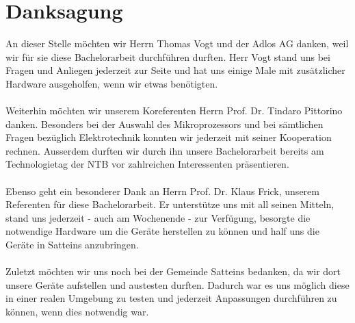 \section{Danksagung}
An dieser Stelle möchten wir Herrn Thomas Vogt und der Adlos AG danken, weil wir für sie diese Bachelorarbeit durchführen durften. Herr Vogt stand uns bei Fragen und Anliegen jederzeit zur Seite und hat uns einige Male mit zusätzlicher Hardware ausgeholfen, wenn wir etwas benötigten.\\\\
Weiterhin möchten wir unserem Koreferenten Herrn Prof. Dr. Tindaro Pittorino danken. Besonders bei der Auswahl des Mikroprozessors und bei sämtlichen Fragen bezüglich Elektrotechnik konnten wir jederzeit mit seiner Kooperation rechnen. Ausserdem durften wir durch ihn unsere Bachelorarbeit bereits am Technologietag der NTB vor zahlreichen Interessenten präsentieren.\\\\
Ebenso geht ein besonderer Dank an Herrn Prof. Dr. Klaus Frick, unserem Referenten für diese Bachelorarbeit. Er unterstütze uns mit all seinen Mitteln, stand uns jederzeit - auch am Wochenende - zur Verfügung, besorgte die notwendige Hardware um die Geräte herstellen zu können und half uns die Geräte in Satteins anzubringen.\\\\
Zuletzt möchten wir uns noch bei der Gemeinde Satteins bedanken, da wir dort unsere Geräte aufstellen und austesten durften. Dadurch war es uns möglich diese in einer realen Umgebung zu testen und jederzeit Anpassungen durchführen zu können, wenn dies notwendig war.
\newpage
